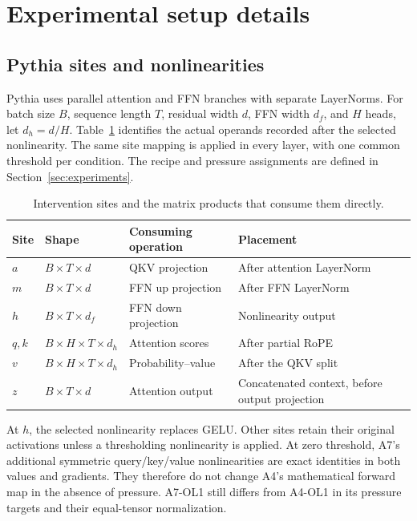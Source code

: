 \section{Experimental setup details}
\label{app:experiment}

\subsection{Pythia sites and nonlinearities}
\label{app:sites}

Pythia uses parallel attention and FFN branches with separate LayerNorms.
For batch size $B$, sequence length $T$, residual width $d$, FFN width $d_f$,
and $H$ heads, let $d_h=d/H$. Table~\ref{tab:sites} identifies the actual
operands recorded after the selected nonlinearity. The same site mapping is applied
in every layer, with one common threshold per condition.
The recipe and pressure assignments are defined in
Section~\ref{sec:experiments}.

\begin{table}[ht]
\centering\small
\caption{Intervention sites and the matrix products that consume them directly.}
\label{tab:sites}
\vspace{4pt}
\begin{tabularx}{\linewidth}{@{}lllX@{}}
\toprule
Site & Shape & Consuming operation & Placement \\
\midrule
$a$ & $B\!\times\!T\!\times\!d$ & QKV projection & After attention LayerNorm \\
$m$ & $B\!\times\!T\!\times\!d$ & FFN up projection & After FFN LayerNorm \\
$h$ & $B\!\times\!T\!\times\!d_f$ & FFN down projection & Nonlinearity output \\
$q,k$ & $B\!\times\!H\!\times\!T\!\times\!d_h$ & Attention scores & After partial RoPE \\
$v$ & $B\!\times\!H\!\times\!T\!\times\!d_h$ & Probability--value & After the QKV split \\
$z$ & $B\!\times\!T\!\times\!d$ & Attention output & Concatenated context, before output projection \\
\bottomrule
\end{tabularx}
\end{table}

At $h$, the selected nonlinearity replaces GELU. Other sites retain their
original activations unless a thresholding nonlinearity is applied.
At zero threshold, A7's additional symmetric query/key/value nonlinearities are exact
identities in both values and gradients. They therefore do not change A4's
mathematical forward map in the absence of pressure. A7-OL1 still differs
from A4-OL1 in its pressure targets and their equal-tensor normalization.

